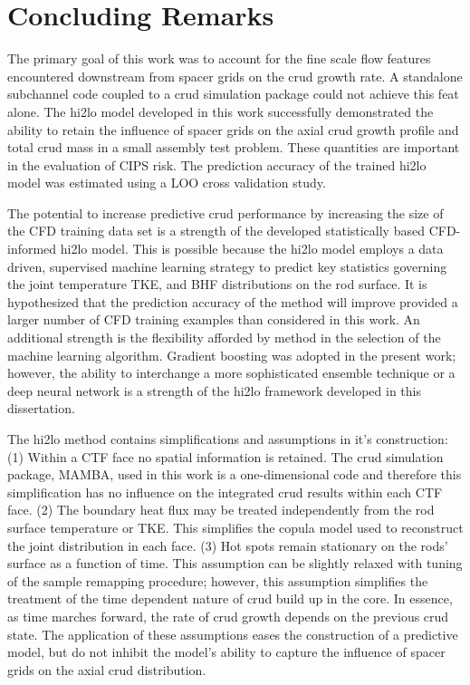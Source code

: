 
\section{Concluding Remarks}

The primary goal of this work was to account for the fine scale flow features encountered downstream from spacer grids on the crud growth rate.  A standalone subchannel code coupled to a crud simulation package could not achieve this feat alone.  The hi2lo model developed in this work successfully demonstrated the ability to retain the influence of spacer grids on the axial crud growth profile and total crud mass in a small assembly test problem.  These quantities are important in the evaluation of CIPS risk. The prediction accuracy of the trained hi2lo model was estimated using a LOO cross validation study.

The potential to increase predictive crud performance by increasing the size of the CFD training data set is a strength of the developed statistically based CFD-informed hi2lo model.  This is possible because the hi2lo model employs a data driven, supervised machine learning strategy to predict key statistics governing the joint temperature TKE, and BHF distributions on the rod surface.   It is hypothesized that the prediction accuracy of the method will improve provided a larger number of CFD training examples than considered in this work.  An additional strength is the flexibility afforded by method in the selection of the machine learning algorithm.  Gradient boosting was adopted in the present work; however, the ability to interchange a more sophisticated ensemble technique or a deep neural network is a strength of the hi2lo framework developed in this dissertation.

The hi2lo method contains simplifications and assumptions in it's construction:  (1) Within a CTF face no spatial information is retained.  The crud simulation package, MAMBA, used in this work is a one-dimensional code and therefore this simplification has no influence on the integrated crud results within each CTF face.  (2) The boundary heat flux may be treated independently from the rod surface temperature or TKE.  This simplifies the copula model used to reconstruct the joint distribution in each face.  (3) Hot spots remain stationary on the rods' surface as a function of time.  This assumption can be slightly relaxed with tuning of the sample remapping procedure; however, this assumption simplifies the treatment of the time dependent nature of crud build up in the core.  In essence, as time marches forward, the rate of crud growth depends on the previous crud state.  The application of these assumptions eases the construction of a predictive model, but do not inhibit the model's ability to capture the influence of spacer grids on the axial crud distribution. 
